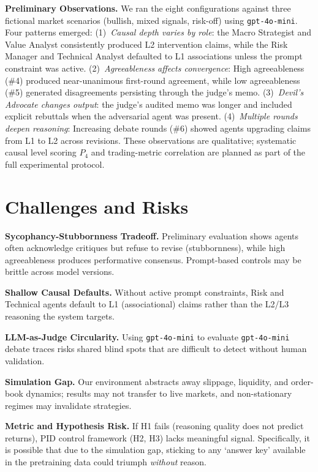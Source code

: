 \documentclass{article}
\begin{document}
\textbf{Preliminary Observations.}
We ran the eight configurations against three fictional market scenarios (bullish, mixed signals, risk-off) using \texttt{gpt-4o-mini}. Four patterns emerged:
(1)~\emph{Causal depth varies by role}: the Macro Strategist and Value Analyst consistently produced L2 intervention claims, while the Risk Manager and Technical Analyst defaulted to L1 associations unless the prompt constraint was active.
(2)~\emph{Agreeableness affects convergence}: High agreeableness (\#4) produced near-unanimous first-round agreement, while low agreeableness (\#5) generated disagreements persisting through the judge's memo.
(3)~\emph{Devil's Advocate changes output}: the judge's audited memo was longer and included explicit rebuttals when the adversarial agent was present.
(4)~\emph{Multiple rounds deepen reasoning}: Increasing debate rounds (\#6) showed agents upgrading claims from L1 to L2 across revisions. These observations are qualitative; systematic causal level scoring $P_4$ and trading-metric correlation are planned as part of the full experimental protocol.

\vspace{-6pt}
\section{Challenges and Risks}

\textbf{Sycophancy-Stubbornness Tradeoff.} Preliminary evaluation shows agents often acknowledge critiques but refuse to revise (stubbornness), while high agreeableness produces performative consensus. Prompt-based controls may be brittle across model versions.

\textbf{Shallow Causal Defaults.} Without active prompt constraints, Risk and Technical agents default to L1 (associational) claims rather than the L2/L3 reasoning the system targets.

\textbf{LLM-as-Judge Circularity.} Using \texttt{gpt-4o-mini} to evaluate \texttt{gpt-4o-mini} debate traces risks shared blind spots that are difficult to detect without human validation.

\textbf{Simulation Gap.} Our environment abstracts away slippage, liquidity, and order-book dynamics; results may not transfer to live markets, and non-stationary regimes may invalidate strategies.

\textbf{Metric and Hypothesis Risk.} If H1 fails (reasoning quality does not predict returns), PID control framework (H2, H3) lacks meaningful signal. Specifically, it is possible that due to the simulation gap, sticking to any `answer key' available in the pretraining data could triumph \emph{without} reason.
\end{document}
